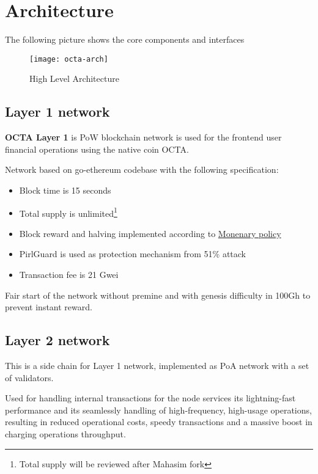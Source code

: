 \section{Architecture}

The following picture shows the core components and interfaces

\begin{figure}[h]
    \centering
    \texttt{[image: octa-arch]}
    \caption{High Level Architecture}
\end{figure}

\subsection{Layer 1 network}

\textbf{OCTA Layer 1} is PoW\cite{pow} blockchain network is used for the frontend user financial operations using the native coin OCTA.

Network based on go-ethereum\cite{go-ethereum} codebase with the following specification:

\begin{itemize}
    \item Block time is 15 seconds
    \item Total supply is unlimited\footnote{Total supply will be reviewed after Mahasim fork}
    \item Block reward and halving implemented according to \hyperref[sec:mp]{Monenary policy}
    \item PirlGuard is used as protection mechanism from 51\% attack
    \item Transaction fee is 21 Gwei
\end{itemize}

Fair start of the network without premine and with genesis difficulty in 100Gh to prevent instant reward.

\subsection{Layer 2 network}

This is a side chain for Layer 1 network, implemented as PoA\cite{poa} network with a set of validators.

Used for handling internal transactions for the node services its lightning-fast performance and its seamlessly handling of high-frequency, high-usage operations,
resulting in reduced operational costs, speedy transactions and a massive boost in charging operations throughput.

